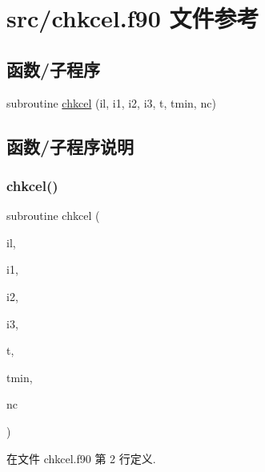 \hypertarget{chkcel_8f90}{}\section{src/chkcel.f90 文件参考}
\label{chkcel_8f90}
\subsection*{函数/子程序}
\begin{DoxyCompactItemize}
\item 
subroutine \mbox{\hyperlink{chkcel_8f90_a7480f13fdd6684db8dfb1d67a5fecd37}{chkcel}} (il, i1, i2, i3, t, tmin, nc)
\end{DoxyCompactItemize}


\subsection{函数/子程序说明}
\mbox{\label{chkcel_8f90_a7480f13fdd6684db8dfb1d67a5fecd37}} 
\subsubsection{\texorpdfstring{chkcel()}{chkcel()}}
{\footnotesize\ttfamily subroutine chkcel (\begin{DoxyParamCaption}\item[{}]{il,  }\item[{}]{i1,  }\item[{}]{i2,  }\item[{}]{i3,  }\item[{}]{t,  }\item[{}]{tmin,  }\item[{}]{nc }\end{DoxyParamCaption})}



在文件 chkcel.\+f90 第 2 行定义.

